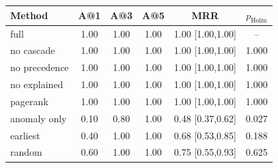 \begin{tabular}{lccccc}
\toprule
Method & A@1 & A@3 & A@5 & MRR & $p_{\mathrm{Holm}}$ \\
\midrule
full & 1.00 & 1.00 & 1.00 & 1.00 [1.00,1.00] & -- \\
no cascade & 1.00 & 1.00 & 1.00 & 1.00 [1.00,1.00] & 1.000 \\
no precedence & 1.00 & 1.00 & 1.00 & 1.00 [1.00,1.00] & 1.000 \\
no explained & 1.00 & 1.00 & 1.00 & 1.00 [1.00,1.00] & 1.000 \\
pagerank & 1.00 & 1.00 & 1.00 & 1.00 [1.00,1.00] & 1.000 \\
anomaly only & 0.10 & 0.80 & 1.00 & 0.48 [0.37,0.62] & 0.027 \\
earliest & 0.40 & 1.00 & 1.00 & 0.68 [0.53,0.85] & 0.188 \\
random & 0.60 & 1.00 & 1.00 & 0.75 [0.55,0.93] & 0.625 \\
\bottomrule
\end{tabular}
